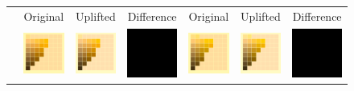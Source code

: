 \begin{figure}[t!]
	\centering
	{\sffamily
		\setlength\tabcolsep{0.5pt}
		\begin{tabular}{ccccccc}
			&Original& Uplifted & Difference &\quad Original & Uplifted & Difference
			\vspace{1em} \\ 
			\raisebox{0.4cm}[0pt][0pt]{\parbox[c][0pt][c]{0cm}{\hspace{-1.5em}\\[20pt]}\par}
			&\includegraphics[width=.155\linewidth]{img/results_uplift_page09_originalFL11.png}
			&
			\includegraphics[width=.155\linewidth]{img/results_uplift_page09_sigmoidFL11.png}
			& 
			\includegraphics[width=.155\linewidth]{img/toDelete.png}
			&\quad
			\includegraphics[width=.155\linewidth]{img/results_uplift_page10_originalFL11.png}
			&
			\includegraphics[width=.155\linewidth]{img/results_uplift_page10_sigmoidFL11.png}
			&
			\includegraphics[width=.155\linewidth]{img/toDelete.png}

\end{tabular}}
\end{figure}
